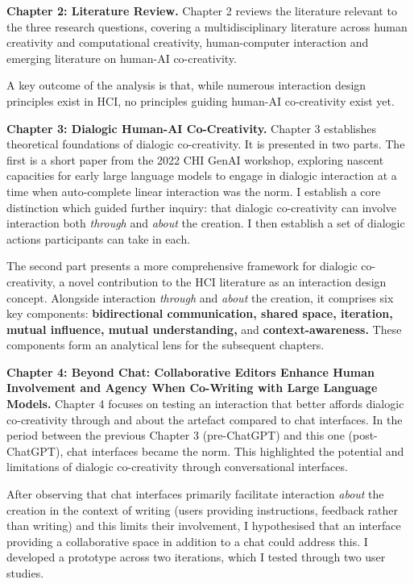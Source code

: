 \textbf{Chapter 2: Literature Review.} Chapter 2 reviews the literature relevant to the three research questions, covering a multidisciplinary literature across human creativity and computational creativity, human-computer interaction and emerging literature on human-AI co-creativity. 

 A key outcome of the analysis is that, while numerous interaction design principles exist in HCI, no principles guiding human-AI co-creativity exist yet.

\textbf{Chapter 3: Dialogic Human-AI Co-Creativity.} Chapter 3 establishes theoretical foundations of dialogic co-creativity. It is presented in two parts. The first is a short paper from the 2022 CHI GenAI workshop, exploring nascent capacities for early large language models to engage in dialogic interaction at a time when auto-complete linear interaction was the norm. I establish a core distinction which guided further inquiry: that dialogic co-creativity can involve interaction both \textit{through} and \textit{about} the creation. I then establish a set of dialogic actions participants can take in each. 

The second part presents a more comprehensive framework for dialogic co-creativity, a novel contribution to the HCI literature as an interaction design concept. Alongside interaction \textit{through} and \textit{about} the creation, it comprises six key components: \textbf{bidirectional communication, shared space, iteration, mutual influence, mutual understanding, }and\textbf{ context-awareness.} These components form an analytical lens for the subsequent chapters.

\textbf{Chapter 4: Beyond Chat: Collaborative Editors Enhance Human Involvement and Agency When Co-Writing with Large Language Models.} Chapter 4 focuses on testing an interaction that better affords dialogic co-creativity through and about the artefact compared to chat interfaces. In the period between the previous Chapter 3 (pre-ChatGPT) and this one (post-ChatGPT), chat interfaces became the norm. This highlighted the potential and limitations of dialogic co-creativity through conversational interfaces. 

After observing that chat interfaces primarily facilitate interaction \textit{about} the creation in the context of writing (users providing instructions, feedback rather than writing) and this limits their involvement, I hypothesised that an interface providing a collaborative space in addition to a chat could address this. I developed a prototype across two iterations, which I tested through two user studies.  

